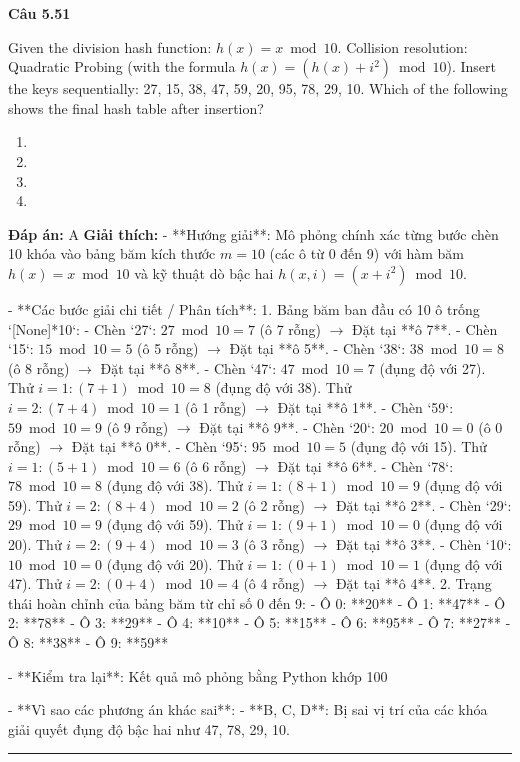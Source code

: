 \documentclass[11pt,a4paper]{article}
\newenvironment{question}[1]{%
  \par\vspace{1em}\noindent\textbf{\large Câu #1}\par\vspace{0.4em}
}{%
  \par\vspace{1em}\hrule\vspace{0.6em}
}
\newenvironment{choices}{%
  \begin{enumerate}[label=\textbf{\Alph*.},leftmargin=2.2em,itemsep=2pt,topsep=3pt]
}{%
  \end{enumerate}
}
\newcommand{\choice}{\item}
\begin{document}
\begin{question}{5.51}
Given the division hash function: \(h(x) = x \bmod 10\). Collision resolution: Quadratic Probing (with the formula \(h(x) = (h(x) + i^2) \bmod 10\)). Insert the keys sequentially: 27, 15, 38, 47, 59, 20, 95, 78, 29, 10. Which of the following shows the final hash table after insertion?
\begin{choices}
\choice [0: 20, 1: 47, 2: 78, 3: 29, 4: 10, 5: 15, 6: 95, 7: 27, 8: 38, 9: 59]
\choice [0: 10, 1: 47, 2: 78, 3: 29, 4: 20, 5: 15, 6: 95, 7: 27, 8: 38, 9: 59]
\choice [0: 20, 1: 10, 2: 78, 3: 29, 4: 47, 5: 15, 6: 95, 7: 27, 8: 38, 9: 59]
\choice [0: 20, 1: 47, 2: 29, 3: 78, 4: 10, 5: 15, 6: 95, 7: 27, 8: 38, 9: 59]
\end{choices}
\textbf{Đáp án:} A
\textbf{Giải thích:} - **Hướng giải**:
  Mô phỏng chính xác từng bước chèn 10 khóa vào bảng băm kích thước \(m = 10\) (các ô từ 0 đến 9) với hàm băm \(h(x) = x \bmod 10\) và kỹ thuật dò bậc hai \(h(x, i) = (x + i^2) \bmod 10\).

- **Các bước giải chi tiết / Phân tích**:
  1. Bảng băm ban đầu có 10 ô trống `[None]*10`:
     - Chèn `27`: \(27 \bmod 10 = 7\) (ô 7 rỗng) \(\rightarrow\) Đặt tại **ô 7**.
     - Chèn `15`: \(15 \bmod 10 = 5\) (ô 5 rỗng) \(\rightarrow\) Đặt tại **ô 5**.
     - Chèn `38`: \(38 \bmod 10 = 8\) (ô 8 rỗng) \(\rightarrow\) Đặt tại **ô 8**.
     - Chèn `47`: \(47 \bmod 10 = 7\) (đụng độ với 27). Thử \(i=1: (7+1)\bmod 10 = 8\) (đụng độ với 38). Thử \(i=2: (7+4)\bmod 10 = 1\) (ô 1 rỗng) \(\rightarrow\) Đặt tại **ô 1**.
     - Chèn `59`: \(59 \bmod 10 = 9\) (ô 9 rỗng) \(\rightarrow\) Đặt tại **ô 9**.
     - Chèn `20`: \(20 \bmod 10 = 0\) (ô 0 rỗng) \(\rightarrow\) Đặt tại **ô 0**.
     - Chèn `95`: \(95 \bmod 10 = 5\) (đụng độ với 15). Thử \(i=1: (5+1)\bmod 10 = 6\) (ô 6 rỗng) \(\rightarrow\) Đặt tại **ô 6**.
     - Chèn `78`: \(78 \bmod 10 = 8\) (đụng độ với 38). Thử \(i=1: (8+1)\bmod 10 = 9\) (đụng độ với 59). Thử \(i=2: (8+4)\bmod 10 = 2\) (ô 2 rỗng) \(\rightarrow\) Đặt tại **ô 2**.
     - Chèn `29`: \(29 \bmod 10 = 9\) (đụng độ với 59). Thử \(i=1: (9+1)\bmod 10 = 0\) (đụng độ với 20). Thử \(i=2: (9+4)\bmod 10 = 3\) (ô 3 rỗng) \(\rightarrow\) Đặt tại **ô 3**.
     - Chèn `10`: \(10 \bmod 10 = 0\) (đụng độ với 20). Thử \(i=1: (0+1)\bmod 10 = 1\) (đụng độ với 47). Thử \(i=2: (0+4)\bmod 10 = 4\) (ô 4 rỗng) \(\rightarrow\) Đặt tại **ô 4**.
  2. Trạng thái hoàn chỉnh của bảng băm từ chỉ số 0 đến 9:
     - Ô 0: **20**
     - Ô 1: **47**
     - Ô 2: **78**
     - Ô 3: **29**
     - Ô 4: **10**
     - Ô 5: **15**
     - Ô 6: **95**
     - Ô 7: **27**
     - Ô 8: **38**
     - Ô 9: **59**

- **Kiểm tra lại**:
  Kết quả mô phỏng bằng Python khớp 100%

- **Vì sao các phương án khác sai**:
  - **B, C, D**: Bị sai vị trí của các khóa giải quyết đụng độ bậc hai như 47, 78, 29, 10.
\end{question}
\end{document}
